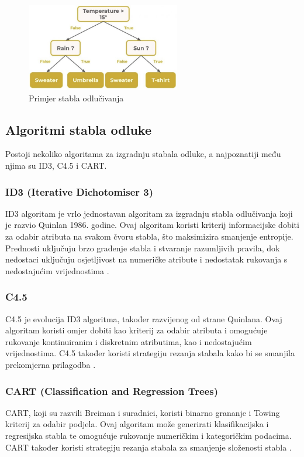 \documentclass[zavrsnirad]{fer}
\begin{document}
\begin{figure}[h]
	\centering
	\includegraphics[width=0.6\textwidth]{Figures/DecisionTree.jpg}
	\caption{Primjer stabla odlučivanja \cite{Keldenich2022}}
	\label{fig:decision_tree}
\end{figure}

\subsection{Algoritmi stabla odluke}
Postoji nekoliko algoritama za izgradnju stabala odluke, a najpoznatiji među njima su ID3, C4.5 i CART.

\subsubsection{ID3 (Iterative Dichotomiser 3)}
ID3 algoritam je vrlo jednostavan algoritam za izgradnju stabla odlučivanja koji je razvio Quinlan 1986. godine. Ovaj algoritam koristi kriterij informacijske dobiti za odabir atributa na svakom čvoru stabla, što maksimizira smanjenje entropije. Prednosti uključuju brzo građenje stabla i stvaranje razumljivih pravila, dok nedostaci uključuju osjetljivost na numeričke atribute i nedostatak rukovanja s nedostajućim vrijednostima \cite{singh2014}.

\subsubsection{C4.5}
C4.5 je evolucija ID3 algoritma, također razvijenog od strane Quinlana. Ovaj algoritam koristi omjer dobiti kao kriterij za odabir atributa i omogućuje rukovanje kontinuiranim i diskretnim atributima, kao i nedostajućim vrijednostima. C4.5 također koristi strategiju rezanja stabala kako bi se smanjila prekomjerna prilagodba \cite{singh2014}.

\subsubsection{CART (Classification and Regression Trees)}
CART, koji su razvili Breiman i suradnici, koristi binarno grananje i Towing kriterij za odabir podjela. Ovaj algoritam može generirati klasifikacijska i regresijska stabla te omogućuje rukovanje numeričkim i kategoričkim podacima. CART također koristi strategiju rezanja stabala za smanjenje složenosti stabla \cite{singh2014}.
\end{document}
